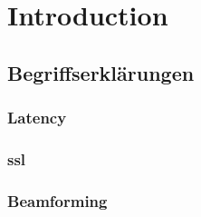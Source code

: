 

\chapter{Introduction}

\section{Begriffserklärungen}

\subsection{Latency}

\subsection{\gls{ssl}}

\subsection{Beamforming}



